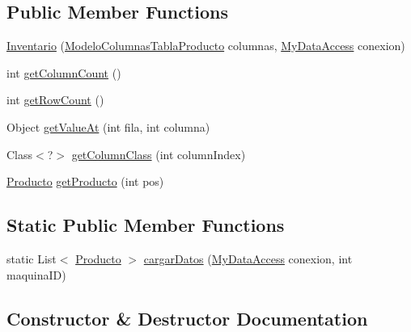 \subsection*{Public Member Functions}
\begin{DoxyCompactItemize}
\item 
\mbox{\hyperlink{class_productos_1_1_inventario_a679f0131ec8bfb9a78d5071ee72f6811}{Inventario}} (\mbox{\hyperlink{class_productos_1_1_modelo_columnas_tabla_producto}{Modelo\+Columnas\+Tabla\+Producto}} columnas, \mbox{\hyperlink{classconexion_s_q_l_1_1_my_data_access}{My\+Data\+Access}} conexion)
\item 
int \mbox{\hyperlink{class_productos_1_1_inventario_a0e88d355b4149cf548ae1cf27e5c342c}{get\+Column\+Count}} ()
\item 
int \mbox{\hyperlink{class_productos_1_1_inventario_ae299062aacb44852791e08833810e8bf}{get\+Row\+Count}} ()
\item 
Object \mbox{\hyperlink{class_productos_1_1_inventario_a79bccc9036dee4d92518ea4b21b3de3d}{get\+Value\+At}} (int fila, int columna)
\item 
Class$<$?$>$ \mbox{\hyperlink{class_productos_1_1_inventario_a7292cea9b1726ac1635a202f3528886e}{get\+Column\+Class}} (int column\+Index)
\item 
\mbox{\hyperlink{class_productos_1_1_producto}{Producto}} \mbox{\hyperlink{class_productos_1_1_inventario_adedc7e3eac62bbbc20bff33ffa9503f0}{get\+Producto}} (int pos)
\end{DoxyCompactItemize}
\subsection*{Static Public Member Functions}
\begin{DoxyCompactItemize}
\item 
static List$<$ \mbox{\hyperlink{class_productos_1_1_producto}{Producto}} $>$ \mbox{\hyperlink{class_productos_1_1_inventario_a89ddb54b03480d0e837f56be549b755c}{cargar\+Datos}} (\mbox{\hyperlink{classconexion_s_q_l_1_1_my_data_access}{My\+Data\+Access}} conexion, int maquina\+ID)
\end{DoxyCompactItemize}


\subsection{Constructor \& Destructor Documentation}
\mbox{\label{class_productos_1_1_inventario_a679f0131ec8bfb9a78d5071ee72f6811}} 
